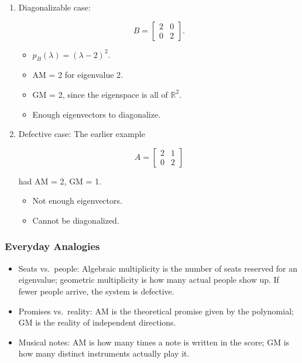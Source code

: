 \documentclass[
  letterpaper,
  DIV=11,
  numbers=noendperiod]{scrreprt}
\providecommand{\tightlist}{%
  \setlength{\itemsep}{0pt}\setlength{\parskip}{0pt}}
\begin{document}
\begin{enumerate}
\def\labelenumi{\arabic{enumi}.}
\item
  Diagonalizable case:

  \[
  B = \begin{bmatrix} 2 & 0 \\ 0 & 2 \end{bmatrix}.
  \]

  \begin{itemize}
  \tightlist
  \item
    \(p_B(\lambda) = (\lambda-2)^2\).
  \item
    AM = 2 for eigenvalue 2.
  \item
    GM = 2, since the eigenspace is all of \(\mathbb{R}^2\).
  \item
    Enough eigenvectors to diagonalize.
  \end{itemize}
\item
  Defective case: The earlier example

  \[
  A = \begin{bmatrix} 2 & 1 \\ 0 & 2 \end{bmatrix}
  \]

  had AM = 2, GM = 1.

  \begin{itemize}
  \tightlist
  \item
    Not enough eigenvectors.
  \item
    Cannot be diagonalized.
  \end{itemize}
\end{enumerate}

\subsubsection{Everyday Analogies}\label{everyday-analogies-59}

\begin{itemize}
\tightlist
\item
  Seats vs.~people: Algebraic multiplicity is the number of seats
  reserved for an eigenvalue; geometric multiplicity is how many actual
  people show up. If fewer people arrive, the system is defective.
\item
  Promises vs.~reality: AM is the theoretical promise given by the
  polynomial; GM is the reality of independent directions.
\item
  Musical notes: AM is how many times a note is written in the score; GM
  is how many distinct instruments actually play it.
\end{itemize}
\end{document}
